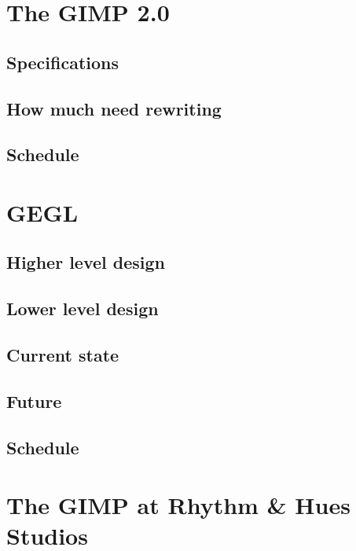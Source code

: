 \documentclass{report}
\begin{document}
\chapter{The GIMP 2.0}

\section{Specifications}
\section{How much need rewriting}
\section{Schedule}

\chapter{GEGL}

\section{Higher level design}
\section{Lower level design}
\section{Current state}
\section{Future}
\section{Schedule}

\chapter{The GIMP at Rhythm \& Hues Studios}

\end{document}
